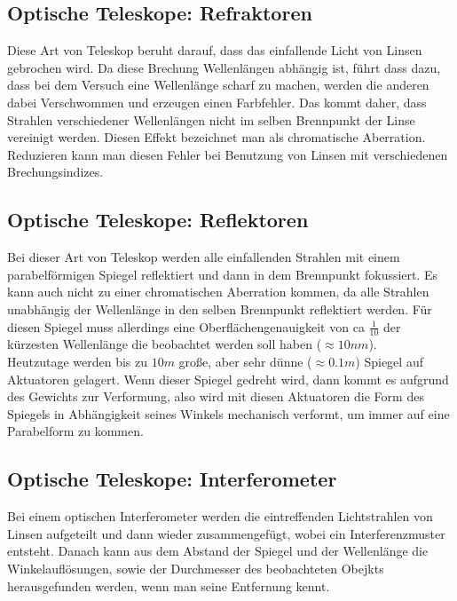 \documentclass[a4paper,12pt]{article}
\begin{document}
\subsection{Optische Teleskope: Refraktoren}
Diese Art von Teleskop beruht darauf, dass das einfallende Licht von Linsen gebrochen wird. Da diese Brechung Wellenlängen abhängig ist, führt dass dazu, dass bei dem Versuch eine Wellenlänge scharf zu machen, werden die anderen dabei Verschwommen und erzeugen einen Farbfehler. Das kommt daher, dass Strahlen verschiedener Wellenlängen nicht im selben Brennpunkt der Linse vereinigt werden. Diesen Effekt bezeichnet man als chromatische Aberration. Reduzieren kann man diesen Fehler bei Benutzung von Linsen mit verschiedenen Brechungsindizes.

\subsection{Optische Teleskope: Reflektoren}
Bei dieser Art von Teleskop werden alle einfallenden Strahlen mit einem parabelförmigen Spiegel reflektiert und dann in dem Brennpunkt fokussiert. Es kann auch nicht zu einer chromatischen Aberration kommen, da alle Strahlen unabhängig der Wellenlänge in den selben Brennpunkt reflektiert werden. Für diesen Spiegel muss allerdings eine Oberflächengenauigkeit von ca $\tfrac{1}{10}$ der kürzesten Wellenlänge die beobachtet werden soll haben ($\approx 10nm$).\\Heutzutage werden bis zu $10m$ große, aber sehr dünne ($\approx 0.1m$) Spiegel auf Aktuatoren gelagert. Wenn dieser Spiegel gedreht wird, dann kommt es aufgrund des Gewichts zur Verformung, also wird mit diesen Aktuatoren die Form des Spiegels in Abhängigkeit seines Winkels mechanisch verformt, um immer auf eine Parabelform zu kommen.

\subsection{Optische Teleskope: Interferometer}
Bei einem optischen Interferometer werden die eintreffenden Lichtstrahlen von Linsen aufgeteilt und dann wieder zusammengefügt, wobei ein Interferenzmuster entsteht. Danach kann aus dem Abstand der Spiegel und der Wellenlänge die Winkelauflösungen, sowie der Durchmesser des beobachteten Obejkts herausgefunden werden, wenn man seine Entfernung kennt.
\end{document}
